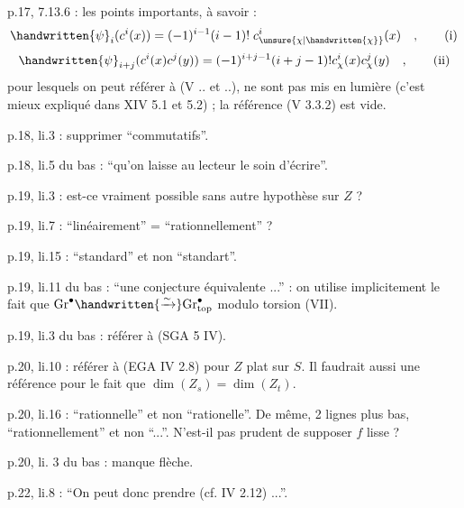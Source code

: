 p.17, 7.13.6 : les points importants, à savoir :
\begingroup
\makeatletter\tagsleft@true\makeatother
\[
\handwritten{\psi}_i(c^i(x)) = (-1)^{i-1}(i-1)!\;c^i_{\unsure{\chi|\handwritten{\chi}}}(x)\quad,\tag*{(i)}
\]
\[
\handwritten{\psi}_{i+j}(c^i(x)c^j(y)) = (-1)^{i+j-1}(i+j-1)!c^i_{\chi}(x)c^j_{\chi}(y)\quad,\tag*{(ii)}
\]
\endgroup
pour lesquels on peut référer à (V .. et ..), ne sont pas
\clearpage
{}
 mis en lumière (c'est mieux expliqué dans XIV 5.1 et 5.2) ; la référence (V 3.3.2) est vide.

p.18, li.3 : supprimer ``commutatifs''.

p.18, li.5 du bas : ``qu'on laisse au lecteur le soin d'écrire''.

p.19, li.3 : est-ce vraiment possible sans autre hypothèse sur $Z$ ?

p.19, li.7 : ``linéairement'' = ``rationnellement'' ?

p.19, li.15 : ``standard'' et non ``standart''.

p.19, li.11 du bas : ``une conjecture équivalente ...'' : on utilise implicitement le fait que $\mathrm{Gr}^{\bullet}\handwritten{\xrightarrow{\sim}}\mathrm{Gr}^{\bullet}_{\mathrm{top}}$ modulo torsion (VII\hspace{2em}).

p.19, li.3 du bas : référer à (SGA 5 IV\hspace{2em}).

p.20, li.10 : référer à (EGA IV 2.8) pour $Z$ plat sur $S$. Il faudrait aussi une référence pour le fait que $\dim(Z_s) = \dim(Z_t)$.

p.20, li.16 : ``rationnelle'' et non ``rationelle''. De même, 2 lignes plus bas, ``rationnellement'' et non ``...''. N'est-il pas prudent de supposer $f$ lisse ?

p.20, li. 3 du bas : manque flèche.

p.22, li.8 : ``On peut donc prendre (cf. IV 2.12) ...''.

